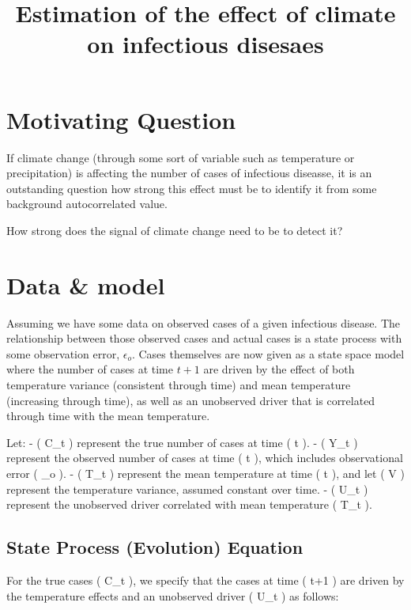 \documentclass[
  letterpaper,
  DIV=11,
  numbers=noendperiod]{scrartcl}
\title{Estimation of the effect of climate on infectious disesaes}
\author{}
\date{}
\renewcommand*\contentsname{Table of contents}
\newcommand\contentsname{Table of contents}
\begin{document}
\maketitle

\renewcommand*\contentsname{Table of contents}
{
\hypersetup{linkcolor=}
\setcounter{tocdepth}{3}
\tableofcontents
}
\section{Motivating Question}\label{motivating-question}

If climate change (through some sort of variable such as temperature or
precipitation) is affecting the number of cases of infectious diseasse,
it is an outstanding question how strong this effect must be to identify
it from some background autocorrelated value.

How strong does the signal of climate change need to be to detect it?

\section{Data \& model}\label{data-model}

Assuming we have some data on observed cases of a given infectious
disease. The relationship between those observed cases and actual cases
is a state process with some observation error, \(\epsilon_o\). Cases
themselves are now given as a state space model where the number of
cases at time \(t+1\) are driven by the effect of both temperature
variance (consistent through time) and mean temperature (increasing
through time), as well as an unobserved driver that is correlated
through time with the mean temperature.

Let: - ( C\_t ) represent the true number of cases at time ( t ). - (
Y\_t ) represent the observed number of cases at time ( t ), which
includes observational error ( \epsilon\_o ). - ( T\_t ) represent the
mean temperature at time ( t ), and let ( V ) represent the temperature
variance, assumed constant over time. - ( U\_t ) represent the
unobserved driver correlated with mean temperature ( T\_t ).

\subsection{State Process (Evolution)
Equation}\label{state-process-evolution-equation}

For the true cases ( C\_t ), we specify that the cases at time ( t+1 )
are driven by the temperature effects and an unobserved driver ( U\_t )
as follows:
\end{document}
